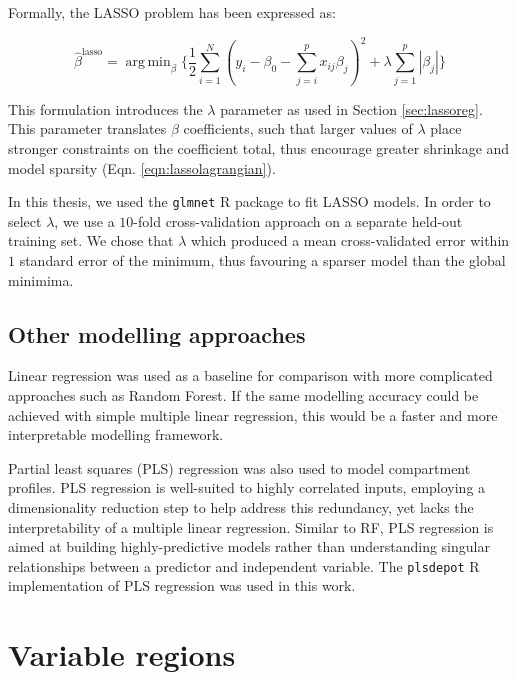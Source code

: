 \documentclass[a4paper,11pt,oneside]{book}
\DeclareMathOperator*{\argmin}{arg\,min}
\begin{document}
Formally, the LASSO problem has been expressed as:\cite{Hastie2001}

\begin{equation}\label{eqn:lassolagrangian}
\hat{\beta}^\mathrm{lasso} = \argmin_\beta \bigg\{ 
\frac{1}{2} \sum_{i=1}^N (y_i - \beta_0 - \sum_{j=i}^p x_{ij}\beta_j)^2 
+ \lambda \sum_{j=1}^p |\beta_j|
\bigg\}
\end{equation} \vspace{.2em}

This formulation introduces the $\lambda$ parameter as used in Section \ref{sec:lassoreg}. This parameter translates $\beta$ coefficients, such that larger values of $\lambda$ place stronger constraints on the coefficient total, thus encourage greater shrinkage and model sparsity (Eqn. \ref{eqn:lassolagrangian}).

In this thesis, we used the \texttt{glmnet} R package to fit LASSO models.\cite{glmnet1, glmnet2} In order to select $\lambda$, we use a $10$-fold cross-validation approach on a separate held-out training set. We chose that $\lambda$ which produced a mean cross-validated error within $1$ standard error of the minimum, thus favouring a sparser model than the global minimima.

\subsection{Other modelling approaches}\label{meth:othermodels}
 
Linear regression was used as a baseline for comparison with more complicated approaches such as Random Forest. If the same modelling accuracy could be achieved with simple multiple linear regression, this would be a faster and more interpretable modelling framework.

Partial least squares (PLS) regression was also used to model compartment profiles. PLS regression is well-suited to highly correlated inputs, employing a dimensionality reduction step to help address this redundancy, yet lacks the interpretability of a multiple linear regression. Similar to RF, PLS regression is aimed at building highly-predictive models rather than understanding singular relationships between a predictor and independent variable.\cite{Tobias1995} The \texttt{plsdepot} R implementation of PLS regression was used in this work.



\section{Variable regions}\label{variable-regions}
\end{document}
